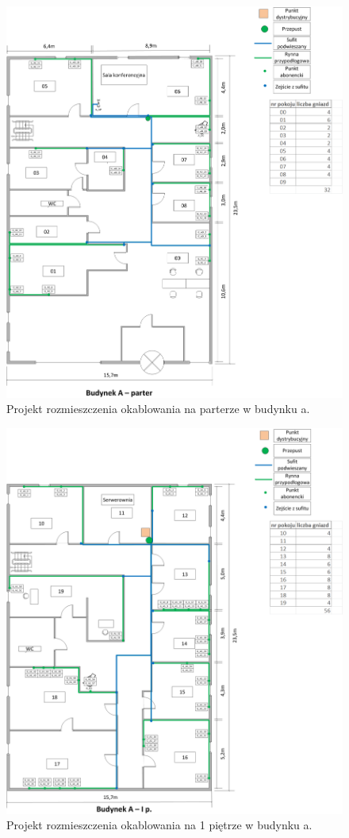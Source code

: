 \documentclass{report}
\begin{document}
\begin{figure}[H]
  \centering
      \includegraphics[width=\textwidth]{./obrazki/kable/a0.png}
  \caption{Projekt rozmieszczenia okablowania na parterze w budynku a.}
\end{figure}

\begin{figure}[H]
  \centering
      \includegraphics[width=\textwidth]{./obrazki/kable/a1.png}
  \caption{Projekt rozmieszczenia okablowania na 1 piętrze w budynku a.}
\end{figure}
\end{document}
